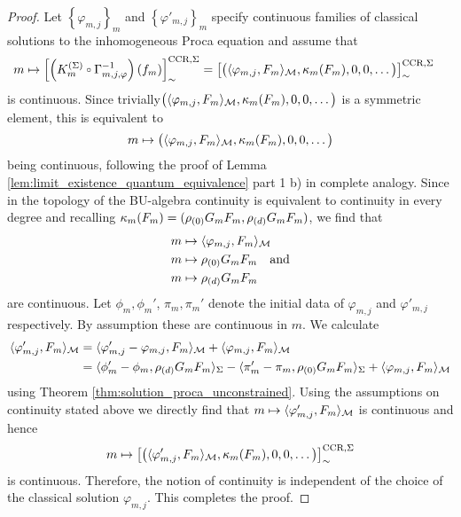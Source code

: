 \begin{proof}
Let $\left\{\varphi_{m,j} \right\}_m$ and $\left\{\varphi'_{m,j} \right\}_m$ specify continuous families of classical solutions to the inhomogeneous Proca equation and assume that
\begin{align}
	m &\mapsto \left[ \left( K^{(\Sigma)}_m \comp \Gamma^{-1}_{m,j,\varphi} \right) (f_m) \right]_\sim^{\text{CCR}, \Sigma}
	=\left[   \big( \langle \varphi_{m,j} , F_m \rangle_\M ,\kappa_m(F_m),0,0,\dots\big) \right]_\sim^{\text{CCR}, \Sigma}
\end{align}
is continuous. Since trivially$\big( \langle \varphi_{m,j} , F_m \rangle_{\mathcal{M}} ,\kappa_m(F_m),0,0,\dots\big)$ is a symmetric element, this is equivalent to
\begin{align}
	m \mapsto   \big( \langle \varphi_{m,j} , F_m \rangle_{\mathcal{M}} ,\kappa_m(F_m),0,0,\dots\big)
\end{align}
being continuous, following the proof of Lemma \ref{lem:limit_existence_quantum_equivalence} part 1 b) in complete analogy. Since in the topology of the BU-algebra continuity is equivalent to continuity in every degree and recalling $\kappa_m(F_m) = (\rho_{(0)} G_m F_m, \rho_{(d)} G_m F_m)$, we find that
\begin{align}
	m &\mapsto \langle \varphi_{m,j} , F_m \rangle_{\mathcal{M}} \\
	m &\mapsto \rho_{(0)} G_m F_m \quad\text{and}\\
	m &\mapsto \rho_{(d)} G_m F_m
\end{align}
are continuous. Let $\phi_m,\phi_m'$, $\pi_m,\pi_m'$ denote the initial data of $\varphi_{m,j}$ and $\varphi'_{m,j}$ respectively. By assumption these are continuous in $m$. We calculate
\begin{align}
	\langle \varphi'_{m,j} , F_m \rangle_{\mathcal{M}}
	&= \langle \varphi'_{m,j} - \varphi_{m,j} , F_m \rangle_{\mathcal{M}} + \langle \varphi_{m,j} , F_m \rangle_{\mathcal{M}} \\
	&= \langle \phi'_m - \phi_m, \rho_{(d)} G_m F_m\rangle_\Sigma - \langle \pi'_m - \pi_m, \rho_{(0)} G_m F_m\rangle_\Sigma + \langle \varphi_{m,j} , F_m \rangle_{\mathcal{M}} \notag
\end{align}
using Theorem \ref{thm:solution_proca_unconstrained}. Using the assumptions on continuity stated above we directly find that $m \mapsto \langle \varphi'_{m,j} , F_m \rangle_{\mathcal{M}} $ is continuous and hence
\begin{align}
	m \mapsto \left[   \big( \langle \varphi'_{m,j} , F_m \rangle_{\mathcal{M}} ,\kappa_m(F_m),0,0,\dots\big) \right]_\sim^{\text{CCR}, \Sigma}
\end{align}
is continuous. Therefore, the notion of continuity is independent of the choice of the classical solution $\varphi_{m,j}$.
This completes the proof.
\end{proof}
